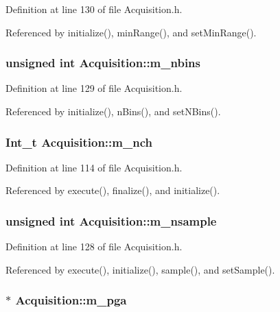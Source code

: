 Definition at line 130 of file Acquisition.h.

Referenced by initialize(), minRange(), and setMinRange().\hypertarget{classAcquisition_a05bccdc4b9ada37beaeba8794ccef12d}{
\subsubsection[{m\_\-nbins}]{\setlength{\rightskip}{0pt plus 5cm}unsigned int {\bf Acquisition::m\_\-nbins}}}
\label{classAcquisition_a05bccdc4b9ada37beaeba8794ccef12d}


Definition at line 129 of file Acquisition.h.

Referenced by initialize(), nBins(), and setNBins().\hypertarget{classAcquisition_a1860c7a03a65ea7a778d30dd4a40e1e1}{
\subsubsection[{m\_\-nch}]{\setlength{\rightskip}{0pt plus 5cm}Int\_\-t {\bf Acquisition::m\_\-nch}}}
\label{classAcquisition_a1860c7a03a65ea7a778d30dd4a40e1e1}


Definition at line 114 of file Acquisition.h.

Referenced by execute(), finalize(), and initialize().\hypertarget{classAcquisition_a26d0f1a44309ffac49c365b7ee568ab2}{
\subsubsection[{m\_\-nsample}]{\setlength{\rightskip}{0pt plus 5cm}unsigned int {\bf Acquisition::m\_\-nsample}}}
\label{classAcquisition_a26d0f1a44309ffac49c365b7ee568ab2}


Definition at line 128 of file Acquisition.h.

Referenced by execute(), initialize(), sample(), and setSample().\hypertarget{classAcquisition_aac113fd42c6574cdb4154e9808a21b67}{
\subsubsection[{m\_\-pga}]{$\ast$ {\bf Acquisition::m\_\-pga}}}
\label{classAcquisition_aac113fd42c6574cdb4154e9808a21b67}


